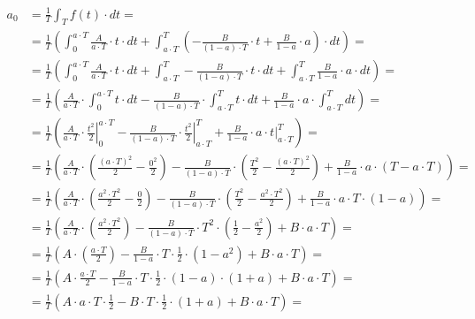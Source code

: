 \begin{task}
\begin{align*}
a_0&=\frac{1}{T}\int_{T}f(t) \cdot dt=\\
&=\frac{1}{T}\left(\int_{0}^{a\cdot T} \frac{A}{a \cdot T} \cdot t \cdot dt + \int_{a \cdot T}^{T}\left( -\frac{B}{\left(1 -a\right) \cdot T} \cdot t + \frac{B}{1-a}\cdot a\right) \cdot dt\right)=\\
&=\frac{1}{T}\left(\int_{0}^{a\cdot T} \frac{A}{a \cdot T} \cdot t \cdot dt + \int_{a \cdot T}^{T} -\frac{B}{\left(1 -a\right) \cdot T} \cdot t \cdot dt + \int_{a \cdot T}^{T} \frac{B}{1-a}\cdot a \cdot dt\right)=\\
&=\frac{1}{T}\left(\frac{A}{a \cdot T} \cdot \int_{0}^{a\cdot T} t \cdot dt -\frac{B}{\left(1 -a\right) \cdot T} \cdot  \int_{a \cdot T}^{T} t \cdot dt +\frac{B}{1-a}\cdot a \cdot \int_{a \cdot T}^{T} dt\right)=\\
&=\frac{1}{T}\left(\frac{A}{a \cdot T} \cdot \left. \frac{t^2}{2} \right|_{0}^{a\cdot T} -\frac{B}{\left(1 -a\right) \cdot T} \cdot  \left. \frac{t^2}{2} \right|_{a \cdot T}^{T} +\frac{B}{1-a}\cdot a \cdot \left. t\right|_{a \cdot T}^{T}\right)=\\
&=\frac{1}{T}\left(\frac{A}{a \cdot T} \cdot \left( \frac{\left(a\cdot T\right)^2}{2} - \frac{0^2}{2} \right) -\frac{B}{\left(1 -a\right) \cdot T} \cdot  \left( \frac{T^2}{2} -\frac{\left(a\cdot T\right)^2}{2}\right) +\frac{B}{1-a}\cdot a \cdot \left( T - a\cdot T\right)\right)=\\
&=\frac{1}{T}\left(\frac{A}{a \cdot T} \cdot \left( \frac{a^2\cdot T^2}{2} - \frac{0}{2} \right) -\frac{B}{\left(1 -a\right) \cdot T} \cdot  \left( \frac{T^2}{2} -\frac{a^2\cdot T^2}{2}\right) +\frac{B}{1-a}\cdot a \cdot T \cdot \left( 1 - a\right)\right)=\\
&=\frac{1}{T}\left(\frac{A}{a \cdot T} \cdot \left( \frac{a^2\cdot T^2}{2} \right) -\frac{B}{\left(1 -a\right) \cdot T} \cdot T^2 \cdot \left( \frac{1}{2} -\frac{a^2}{2}\right) +B\cdot a \cdot T \right)=\\
&=\frac{1}{T}\left(A \cdot \left( \frac{a\cdot T}{2} \right) -\frac{B}{1 -a} \cdot T \cdot \frac{1}{2}\cdot \left( 1 -a^2\right) +B\cdot a \cdot T \right)=\\
&=\frac{1}{T}\left(A \cdot \frac{a\cdot T}{2} -\frac{B}{1 -a} \cdot T \cdot \frac{1}{2}\cdot \left( 1 -a\right)\cdot \left( 1 +a\right) +B\cdot a \cdot T \right)=\\
&=\frac{1}{T}\left(A \cdot a\cdot T \cdot \frac{1}{2} - B \cdot T \cdot \frac{1}{2}\cdot \left( 1 +a\right) +B\cdot a \cdot T \right)=\\

\end{align*}
\end{task}
